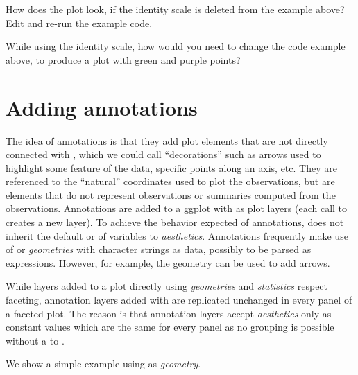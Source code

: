\documentclass[krantz2]{krantz}\usepackage{knitr}
\begin{document}
\begin{playground}
How does the plot look, if the identity scale is deleted from the example above? Edit and re-run the example code.

While using the identity scale, how would you need to change the code example above, to produce a plot with green and purple points?
\end{playground}

\section{Adding annotations}\label{sec:plot:annotations}
The idea of annotations is that they add plot elements that are not directly connected with , which we could call ``decorations'' such as arrows used to highlight some feature of the data, specific points along an axis, etc. They are referenced to the ``natural'' coordinates used to plot the observations, but are elements that do not represent observations or summaries computed from the observations.  Annotations are added to a ggplot with  as plot layers (each call to  creates a new layer). To achieve the behavior expected of annotations,  does not inherit the default  or  of variables to \emph{aesthetics}. Annotations frequently make use of  or  \emph{geometries} with character strings as data, possibly to be parsed as expressions. However, for example, the  geometry can be used to add arrows.

\begin{warningbox}
While layers added to a plot directly using \emph{geometries} and \emph{statistics} respect faceting, annotation layers added with  are replicated unchanged in every panel of a faceted plot. The reason is that annotation layers accept \emph{aesthetics} only as constant values which are the same for every panel as no grouping is possible without a  to .
\end{warningbox}

We show a simple example using  as \emph{geometry}.
\end{document}
